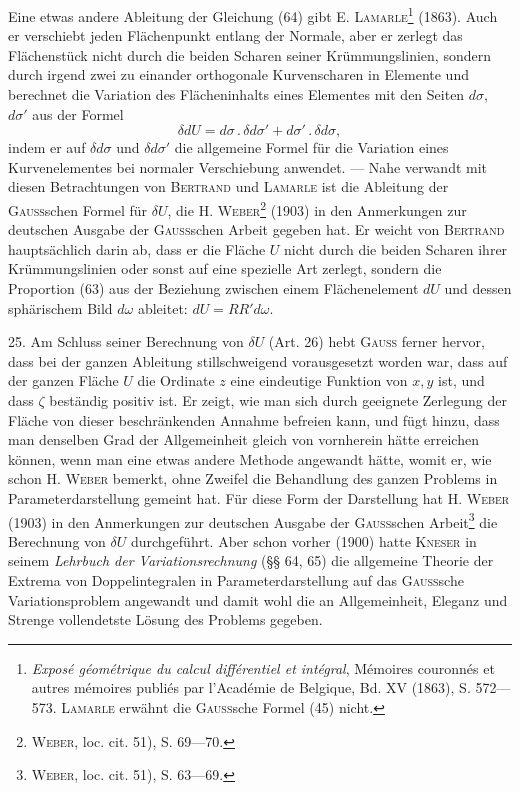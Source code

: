 Eine etwas andere Ableitung der Gleichung (64) gibt E. \textsc{Lamarle}\footnote{\textit{Exposé géométrique du calcul différentiel et intégral}, Mémoires couronnés et autres mémoires
publiés par l’Académie de Belgique, Bd. XV (1863), S. 572—573. \textsc{Lamarle} erwähnt die \textsc{Gauss}sche Formel (45) nicht.} (1863).
Auch er verschiebt jeden Flächenpunkt entlang der Normale, aber er zerlegt
das Flächenstück nicht durch die beiden Scharen seiner Krümmungslinien,
sondern durch irgend zwei zu einander orthogonale Kurvenscharen in Elemente
und berechnet die Variation des Flächeninhalts eines Elementes mit den
Seiten $d\sigma$, $d\sigma'$ aus der Formel
\[
\delta dU=d\sigma\mathpunct{.}\delta d\sigma'+d\sigma'\mathpunct{.}\delta d\sigma,
\]
indem er auf $\delta d\sigma$ und $\delta d\sigma'$ die allgemeine Formel für die Variation eines
Kurvenelementes bei normaler Verschiebung anwendet. — Nahe verwandt mit
diesen Betrachtungen von \textsc{Bertrand} und \textsc{Lamarle} ist die Ableitung der \textsc{Gauss}schen
Formel für $\delta U$, die H. \textsc{Weber}\footnote{\textsc{Weber}, loc. cit. 51), S. 69—70.} (1903) in den Anmerkungen zur deutschen
Ausgabe der \textsc{Gauss}schen Arbeit gegeben hat. Er weicht von \textsc{Bertrand}
hauptsächlich darin ab, dass er die Fläche $U$ nicht durch die beiden Scharen
ihrer Krümmungslinien oder sonst auf eine spezielle Art zerlegt, sondern die
Proportion (63) aus der Beziehung zwischen einem Flächenelement $dU$ und
dessen sphärischem Bild $d\omega$ ableitet: $dU=RR'd\omega$.

25. Am Schluss seiner Berechnung von $\delta U$ (Art. 26) hebt \textsc{Gauss} ferner
hervor, dass bei der ganzen Ableitung stillschweigend vorausgesetzt worden
war, dass auf der ganzen Fläche $U$ die Ordinate $z$ eine eindeutige Funktion
von $x,y$ ist, und dass $\zeta$ beständig positiv ist. Er zeigt, wie man sich durch
geeignete Zerlegung der Fläche von dieser beschränkenden Annahme befreien
\clearpage{}
\noindent kann, und fügt hinzu, dass man denselben Grad der Allgemeinheit gleich von
vornherein hätte erreichen können, wenn man eine etwas andere Methode
angewandt hätte, womit er, wie schon H. \textsc{Weber} bemerkt, ohne Zweifel die
Behandlung des ganzen Problems in Parameterdarstellung gemeint hat. Für
diese Form der Darstellung hat H. \textsc{Weber} (1903) in den Anmerkungen zur
deutschen Ausgabe der \textsc{Gauss}schen Arbeit\footnote{\textsc{Weber}, loc. cit. 51), S. 63—69.} die Berechnung von $\delta U$ durchgeführt.
Aber schon vorher (1900) hatte \textsc{Kneser} in seinem \textit{Lehrbuch der
Variationsrechnung} (§§ 64, 65) die allgemeine Theorie der Extrema von Doppelintegralen
in Parameterdarstellung auf das \textsc{Gauss}sche Variationsproblem angewandt
und damit wohl die an Allgemeinheit, Eleganz und Strenge vollendetste
Lösung des Problems gegeben.

